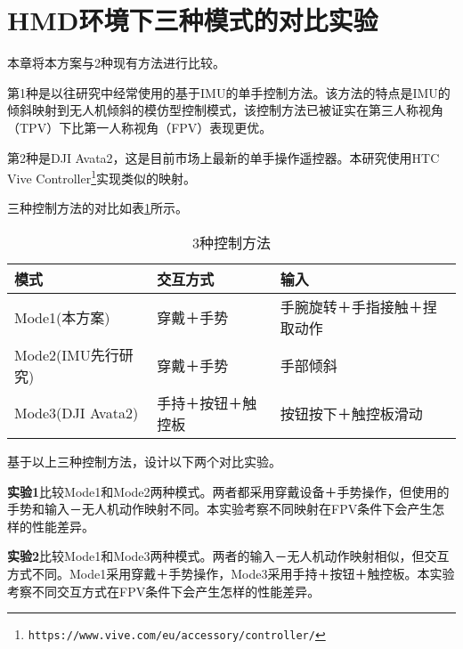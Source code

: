 \ifx\allfiles\undefined


\else
\fi

\section{HMD环境下三种模式的对比实验}
 
本章将本方案与2种现有方法进行比较。

第1种是以往研究中经常使用的基于IMU的单手控制方法\cites{kim2022intuitive,shin2019hand,budiyanto2021navigation,lee2023wearable}。该方法的特点是IMU的倾斜映射到无人机倾斜的模仿型控制模式，该控制方法已被证实在第三人称视角（TPV）下比第一人称视角（FPV）表现更优\cites{kim2022intuitive}。

第2种是DJI Avata2，这是目前市场上最新的单手操作遥控器。本研究使用HTC Vive Controller\footnote{\texttt{https://www.vive.com/eu/accessory/controller/}}实现类似的映射。

三种控制方法的对比如表\ref{tab:three-models}所示。

\begin{table}[bhtp]
    \centering
    \caption{3种控制方法}
    \label{tab:three-models}
    \begin{tabular}{llp{3.5cm}}
        \hline
        模式          & 交互方式              & 输入                  \\ \hline
        Mode1(本方案)      & 穿戴＋手势             & 手腕旋转＋手指接触＋捏取动作    \\ \hline
        Mode2(IMU先行研究)   & 穿戴＋手势             & 手部倾斜               \\ \hline
        Mode3(DJI Avata2) & 手持＋按钮＋触控板        & 按钮按下＋触控板滑动        \\ \hline
    \end{tabular}
\end{table}

基于以上三种控制方法，设计以下两个对比实验。

\textbf{实验1}比较Mode1和Mode2两种模式。两者都采用穿戴设备＋手势操作，但使用的手势和输入－无人机动作映射不同。本实验考察不同映射在FPV条件下会产生怎样的性能差异。

\textbf{实验2}比较Mode1和Mode3两种模式。两者的输入－无人机动作映射相似，但交互方式不同。Mode1采用穿戴＋手势操作，Mode3采用手持＋按钮＋触控板。本实验考察不同交互方式在FPV条件下会产生怎样的性能差异。

